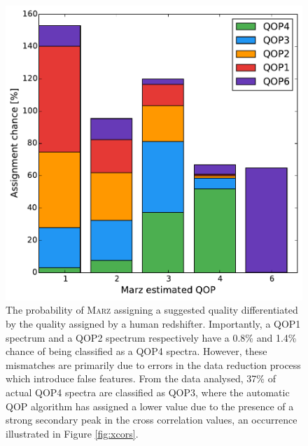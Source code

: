 \documentclass[iop]{emulateapj}
\newcommand{\marz}{\textsc{Marz}}
\begin{document}
\begin{figure}[h]
\centering
\includegraphics[width=\columnwidth]{autoqop.pdf}
\caption{The probability of \marz{} assigning a suggested quality differentiated by the quality assigned by a human redshifter. Importantly, a QOP1 spectrum and a QOP2 spectrum respectively have a 0.8\%  and 1.4\% chance of being classified as a QOP4 spectra. However, these mismatches are primarily due to errors in the data reduction process which introduce false features. From the data analysed, 37\% of actual QOP4 spectra are classified as QOP3, where the automatic QOP algorithm has assigned a lower value due to the presence of a strong secondary peak in the cross correlation values, an occurrence illustrated in Figure \ref{fig:xcors}.}
\label{fig:autoqop}
\end{figure}
\end{document}
